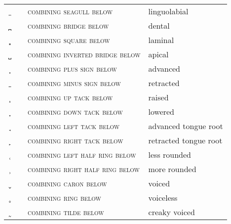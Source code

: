 \label{tab:ipa_diacritics}
 \tablelasttail{\bottomrule}

\begin{center}
\begin{xtabular}{ l L{1.2cm} L{5.6cm} L{4cm} }
{\large \ ̼} &  & \textsc{combining seagull below} & linguolabial \\
{\large \ ̪} &  & \textsc{combining bridge below} & dental \\
{\large \ ̻} &  & \textsc{combining square below} & laminal \\
{\large \ ̺} &  & \textsc{combining inverted bridge below} & apical \\
{\large \ ̟} &  & \textsc{combining plus sign below} & advanced \\
{\large \ ̠} &  & \textsc{combining minus sign below} & retracted \\
{\large \ ̝} &  & \textsc{combining up tack below} & raised \\
{\large \ ̞} &  & \textsc{combining down tack below} & lowered \\
{\large \ ̘} &  & \textsc{combining left tack below} & advanced tongue root \\
{\large \ ̙} &  & \textsc{combining right tack below} & retracted tongue root \\
{\large \ ̜} &  & \textsc{combining left half ring below} & less rounded \\
{\large \ ̹} &  & \textsc{combining right half ring below} & more rounded \\
{\large \ ̬} &  & \textsc{combining caron below} & voiced \\
{\large \ ̥} &  & \textsc{combining ring below} & voiceless \\
{\large \ ̰} &  & \textsc{combining tilde below} & creaky voiced \\

\end{xtabular}
\end{center}
